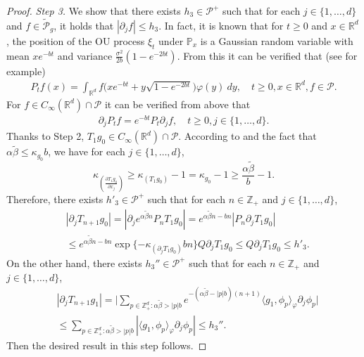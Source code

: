 \documentclass[12pt,a4paper]{amsart}
\theoremstyle{plain}
\theoremstyle{definition}
\numberwithin{equation}{section}
\begin{document}
\begin{proof}
\emph{Step 3.} We show that there exists
 $h_3 \in \mathcal P^+$ such that
for each $j \in \{1,\dots, d\}$ and $f \in \widetilde {\mathcal P}_g$, it holds that $|\partial_j f| \leq h_3$.
In fact, it is known that for $t\geq 0$ and $x\in \mathbb R^d$, the position of the OU process $\xi_t$ under $\mathbb P_x$ is a Gaussian random variable with mean $xe^{-bt}$ and variance $\frac{\sigma^2}{2b} (1- e^{-2bt})$. From this it can be verified that (see \cite{MetafunePallaraPriola2002Spectrum} for example)
\begin{align}
  \label{eq:P:R:3:-1}
  P_t f(x) = \int_{\mathbb R^d} f\big(x e^{-bt} + y \sqrt{1-e^{-2bt}}\big) \varphi(y)~dy,
  \quad t\geq 0, x\in \mathbb R^d, f\in \mathcal P.
\end{align}
For $f \in C_\infty(\mathbb R^d)\cap \mathcal P$ it can be verified from above that
\begin{align}
  \label{eq:P:R:3:1}
 \partial_j P_t f = e^{-bt} P_t \partial_j f,
 \quad t \geq 0, j \in \{1,\dots, d\}.
\end{align}
 Thanks to Step 2, $T_1 g_0 \in C_\infty(\mathbb R^d)\cap \mathcal P$.
According to \cite[Fact 1.3]{MarksMilos2018CLT} and the fact that $\alpha \tilde \beta \leq \kappa _{g_0} b$, we have for each $j \in \{1,\dots, d\}$,
\[
  \kappa_{(\frac{\partial T_1 g_0}{\partial x_j})}
  \geq \kappa_{(T_1 g_0)} - 1
  = \kappa_{g_0} - 1
  \geq \frac{\alpha \tilde \beta}{b} - 1.
\]
Therefore, there exists  $h'_3\in \mathcal P^+$
such that for each $n \in \mathbb Z_+$ and $j\in \{1,\dots,d\}$,
\begin{align}
  & | \partial_j T_{n+1}g_0 |
  = | \partial_j e^{\alpha \tilde \beta n}P_n T_1g_0 |
  = e^{\alpha \tilde \beta n-bn} |P_n \partial_j T_1 g_0| \\
  & \leq e^{\alpha \tilde \beta n-bn} \exp\{-\kappa_{(\partial_j T_1 g_0)}bn\}Q \partial_j T_1g_0
  \leq Q\partial_j T_1g_0
    \leq h'_3.
\end{align}
On the other hand, there exists
 $h_3''\in \mathcal P^+$ such that
for each $n \in \mathbb Z_+$ and $j\in \{1,\dots,d\}$,
\begin{align}
  & |\partial_j T_{n+1}g_1 |
  = \Big| \sum_{p\in \mathbb Z_+^d: \alpha \tilde \beta > |p|b} e^{- (\alpha \tilde \beta - |p|b)(n+1)} \langle g_1, \phi_p \rangle_\varphi \partial_j \phi_p \Big| \\
  & \leq \sum_{p\in \mathbb Z_+^d: \alpha \tilde \beta > |p|b} |\langle g_1, \phi_p \rangle_\varphi \partial_j \phi_p |
    \leq h_3''.
\end{align}
Then the desired result in this step follows.



\end{proof}
\end{document}
